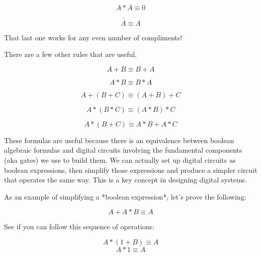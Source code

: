 \begin{equation}
    A * \overline{A} \equiv 0
\end{equation}

\begin{equation}
    \overline{\overline{A}} \equiv A
\end{equation}

That last one works for any even number of compliments!

There are a few other rules that are useful. 

\begin{equation}
    A + B \equiv B + A 
\end{equation}

\begin{equation}
    A * B \equiv B * A
\end{equation}

\begin{equation}
    A + (B + C) \equiv (A + B) + C
\end{equation}

\begin{equation}
    A * (B * C) \equiv (A * B) * C
\end{equation}

\begin{equation}
    A * (B + C) \equiv A * B + A * C
\end{equation}

These formulas are useful because there is an equivalence between boolean
algebraic formulas and digital circuits involving the fundamental components
(aka gates) we use to build them.  We can actually set up digital circuits as
boolean expressions, then simplify those expressions and produce a simpler
circuit that operates the same way. This is a key concept in designing digital
systems.

As an example of simplifying a *boolean expression*, let's prove the following:

\begin{equation}
    A + A * B \equiv A
\end{equation}

See if you can follow this sequence of operations:

\begin{equation}
    A * (1 + B) \equiv A
\end{equation}
\begin{equation}
    A * 1 \equiv A
\end{equation}

